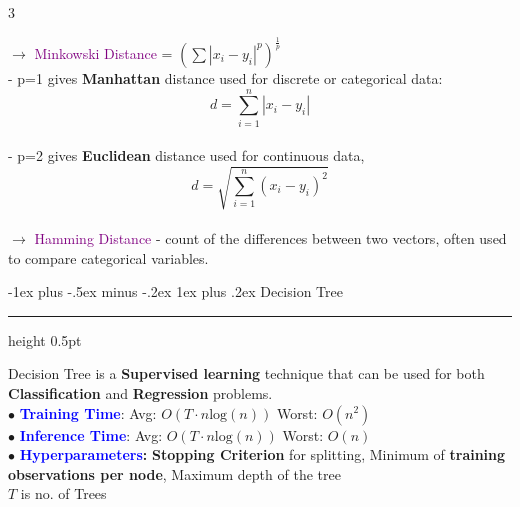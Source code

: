 \documentclass[letterpaper, 10.5pt,landscape]{article}
\makeatletter
\renewcommand{\subsubsection}{\@startsection{subsubsection}{3}{0mm}%
                                {-1ex plus -.5ex minus -.2ex}%
                                {1ex plus .2ex}%
                                {\normalfont\small\bfseries}}
\makeatother
\begin{document}
\begin{multicols*}{3}
\begin{enumerate}
\end{enumerate}









$\rightarrow$ \textcolor{purple}{Minkowski Distance} = \(\boxed{\left(\sum| x_{i} - y_{i}|^{p}\right)^{\frac{1}{p}}} \) \\
\hspace{10pt} - p=1 gives \textbf{Manhattan} distance used for discrete or categorical data: \[\boxed{d = \sum_{i=1}^n |x_i - y_i|} \]  \\
\hspace{10pt} - p=2 gives \textbf{Euclidean} distance used for continuous data, \[\boxed{d = \sqrt{\sum_{i=1}^n (x_i - y_i)^2}} \]\\

\vspace{2pt}
$\rightarrow$ \textcolor{purple}{Hamming Distance} - count of the differences between two vectors, often used to compare categorical variables.




 

 
 




\subsubsection{Decision Tree} {\color{teal}\hrule height 0.5pt} \smallskip

Decision Tree is a \textbf{Supervised learning} technique that can be used for both \textbf{Classification} and \textbf{Regression} problems.\\

\vspace{3pt}
$\bullet$ \textbf{\textcolor{blue}{Training Time}}: Avg: \(O(T \cdot n\text{log}(n))\) \hspace{2pt} Worst: \(O(n^{2})\)  \\
$\bullet$ \textbf{\textcolor{blue}{Inference Time}}:  Avg: \(O(T \cdot n\text{log}(n))\) \hspace{2pt} Worst: \(O(n)\)  \\
$\bullet$ \textbf{\textcolor{blue}{Hyperparameters}:} \textbf{Stopping Criterion} for splitting, Minimum of \textbf{training observations per node},  Maximum depth of the tree \\
$T$ is no. of Trees






\end{multicols*}
\end{document}
